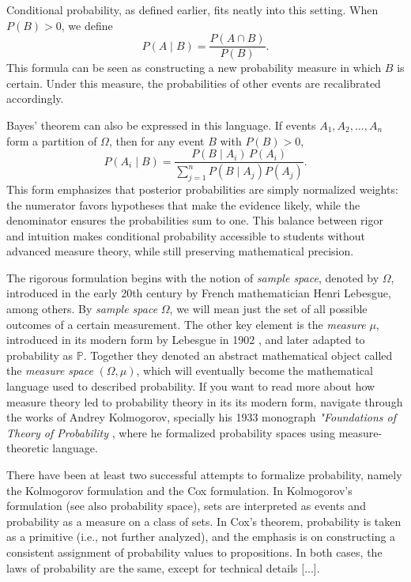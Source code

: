 \documentclass{book}
\begin{document}
Conditional probability, as defined earlier, fits neatly into this setting. When $P(B) > 0$, we define
\[
P(A \mid B) = \frac{P(A \cap B)}{P(B)} .
\]
This formula can be seen as constructing a new probability measure in which $B$ is certain. Under this measure, the probabilities of other events are recalibrated accordingly.

Bayes’ theorem can also be expressed in this language. If events $A_1, A_2, \dots, A_n$ form a partition of $\Omega$, then for any event $B$ with $P(B) > 0$,
\[
P(A_i \mid B) = \frac{P(B \mid A_i)\, P(A_i)}{\sum_{j=1}^n P(B \mid A_j) P(A_j)} .
\]
This form emphasizes that posterior probabilities are simply normalized weights: the numerator favors hypotheses that make the evidence likely, while the denominator ensures the probabilities sum to one. This balance between rigor and intuition makes conditional probability accessible to students without advanced measure theory, while still preserving mathematical precision. 

\medskip

The rigorous formulation begins with the notion of \textit{sample space}, denoted by $\Omega$, introduced in the early 20th century by French mathematician Henri Lebesgue, among others. By \textit{sample space} $\Omega$, we will mean just the set of all possible outcomes of a certain measurement. The other key element is the \textit{measure} $\mu$, introduced in its modern form by Lebesgue in 1902 \cite{lebesgue1902}, and later adapted to probability as $\mathbb{P}$. Together they denoted an abstract mathematical object called the \textit{measure space} $(\Omega, \mu)$, which will eventually become the mathematical language used to described probability. If you want to read more about how measure theory led to probability theory in its its modern form, navigate through the works of Andrey Kolmogorov, specially his 1933 monograph \textit{"Foundations of Theory of Probability} \cite{kolmogorov1933}, where he formalized probability spaces using measure-theoretic language.

\medskip

There have been at least two successful attempts to formalize probability, namely the Kolmogorov formulation and the Cox formulation. In Kolmogorov's formulation (see also probability space), sets are interpreted as events and probability as a measure on a class of sets. In Cox's theorem, probability is taken as a primitive (i.e., not further analyzed), and the emphasis is on constructing a consistent assignment of probability values to propositions. In both cases, the laws of probability are the same, except for technical details [...].\\
\end{document}
